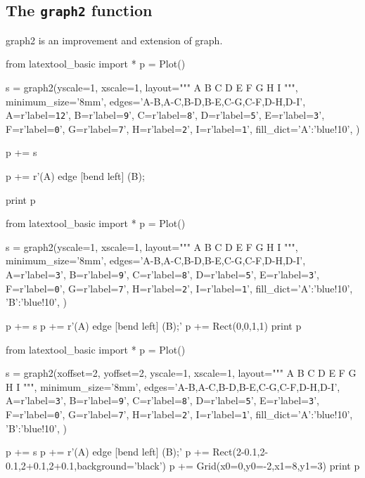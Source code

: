 \subsection{The \texttt{graph2} function}

graph2 is an improvement and extension of graph.

\begin{console}
from latextool_basic import *
p = Plot()

s = graph2(yscale=1, xscale=1,
layout="""
    A 
  B   C 
 D E F G
H I
""",
minimum_size='8mm',
edges='A-B,A-C,B-D,B-E,C-G,C-F,D-H,D-I',
A=r'label=\texttt{12}',
B=r'label=\texttt{9}',
C=r'label=\texttt{8}',
D=r'label=\texttt{5}',
E=r'label=\texttt{3}',
F=r'label=\texttt{0}',
G=r'label=\texttt{7}',
H=r'label=\texttt{2}',
I=r'label=\texttt{1}',
fill_dict={'A':'blue!10'},
)

p += s

p += r'\path[<->,dashed] (A) edge [bend left] (B);

print p
\end{console}



\begin{python}
from latextool_basic import *
p = Plot()

s = graph2(yscale=1, xscale=1,
layout="""
    A 
  B   C 
 D E F G
H I
""",
minimum_size='8mm',
edges='A-B,A-C,B-D,B-E,C-G,C-F,D-H,D-I',
A=r'label=\texttt{3}',
B=r'label=\texttt{9}',
C=r'label=\texttt{8}',
D=r'label=\texttt{5}',
E=r'label=\texttt{3}',
F=r'label=\texttt{0}',
G=r'label=\texttt{7}',
H=r'label=\texttt{2}',
I=r'label=\texttt{1}',
fill_dict={'A':'blue!10', 'B':'blue!10'},
)

p += s
p += r' (A) edge [bend left] (B);'
p += Rect(0,0,1,1)
print p
\end{python}


\begin{python}
from latextool_basic import *
p = Plot()

s = graph2(xoffset=2, yoffset=2, yscale=1, xscale=1,
layout="""
    A 
  B   C 
 D E F G
H I
""",
minimum_size='8mm',
edges='A-B,A-C,B-D,B-E,C-G,C-F,D-H,D-I',
A=r'label=\texttt{3}',
B=r'label=\texttt{9}',
C=r'label=\texttt{8}',
D=r'label=\texttt{5}',
E=r'label=\texttt{3}',
F=r'label=\texttt{0}',
G=r'label=\texttt{7}',
H=r'label=\texttt{2}',
I=r'label=\texttt{1}',
fill_dict={'A':'blue!10', 'B':'blue!10'},
)

p += s
p += r' (A) edge [bend left] (B);'
p += Rect(2-0.1,2-0.1,2+0.1,2+0.1,background='black')
p += Grid(x0=0,y0=-2,x1=8,y1=3)
print p
\end{python}
